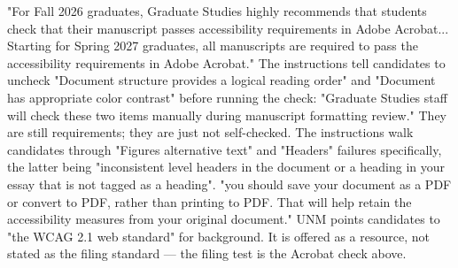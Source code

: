 


%
%
\thesisrequiretagging
\thesisrequiredocumentlanguage
{}
	{"For Fall 2026 graduates, Graduate Studies highly recommends that students
	 check that their manuscript passes accessibility requirements in Adobe
	 Acrobat... Starting for Spring 2027 graduates, all manuscripts are required
	 to pass the accessibility requirements in Adobe Acrobat."}
	{The instructions tell candidates to uncheck "Document structure provides a
	 logical reading order" and "Document has appropriate color contrast" before
	 running the check: "Graduate Studies staff will check these two items
	 manually during manuscript formatting review." They are still requirements;
	 they are just not self-checked.}
	{The instructions walk candidates through "Figures alternative text" and
	 "Headers" failures specifically, the latter being "inconsistent level
	 headers in the document or a heading in your essay that is not tagged as a
	 heading".}
	{"you should save your document as a PDF or convert to PDF, rather than
	 printing to PDF. That will help retain the accessibility measures from your
	 original document."}
	{UNM points candidates to "the WCAG 2.1 web standard" for background. It is
	 offered as a resource, not stated as the filing standard — the filing test
	 is the Acrobat check above.}

